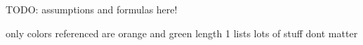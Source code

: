 TODO: assumptions and formulas here!

only colors referenced are orange and green
length 1 lists
lots of stuff dont matter
